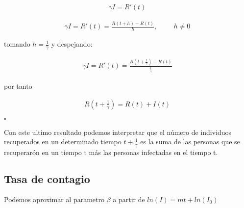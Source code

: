 \begin{Dem}
\begin{align*}
\gamma I = R'(t)
\end{align*}

\begin{align*}
\gamma I = R'(t) = \frac{R\left( t + h \right) - R\left(t\right)}{h}, \hspace{1cm} h \neq 0
\end{align*}

tomando $h = \frac{1}{\gamma}$ y despejando: 

\begin{align*}
\gamma I = R'(t) = \frac{R\left( t + \frac{1}{\gamma} \right) - R\left(t\right)}{\frac{1}{\gamma}}
\end{align*}

por tanto

\begin{align*}
R\left( t + \frac{1}{\gamma} \right) = R(t) + I(t)
\end{align*}

\hfill	$\square$
\end{Dem}

Con este ultimo resultado podemos interpretar que el número de individuos recuperados en un determinado tiempo $t + \frac {1}{\gamma}$  es la suma de las personas que se recuperarón en un tiempo t más las personas infectadas en el tiempo t.

\subsection{\textbf{Tasa de contagio}}

\begin{Af}
Podemos aproximar al parametro $\beta$ a partir de $ln(I) = mt + ln(I_{0})$\cite{Algeria}
\end{Af}

